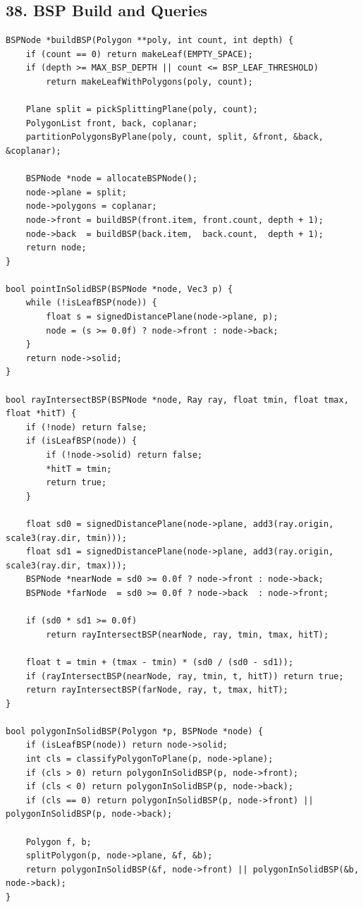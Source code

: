 \documentclass[10pt,letterpaper]{article}
\begin{document}
\subsection*{38. BSP Build and Queries}

\begin{verbatim}
BSPNode *buildBSP(Polygon **poly, int count, int depth) {
    if (count == 0) return makeLeaf(EMPTY_SPACE);
    if (depth >= MAX_BSP_DEPTH || count <= BSP_LEAF_THRESHOLD)
        return makeLeafWithPolygons(poly, count);

    Plane split = pickSplittingPlane(poly, count);
    PolygonList front, back, coplanar;
    partitionPolygonsByPlane(poly, count, split, &front, &back, &coplanar);

    BSPNode *node = allocateBSPNode();
    node->plane = split;
    node->polygons = coplanar;
    node->front = buildBSP(front.item, front.count, depth + 1);
    node->back  = buildBSP(back.item,  back.count,  depth + 1);
    return node;
}

bool pointInSolidBSP(BSPNode *node, Vec3 p) {
    while (!isLeafBSP(node)) {
        float s = signedDistancePlane(node->plane, p);
        node = (s >= 0.0f) ? node->front : node->back;
    }
    return node->solid;
}

bool rayIntersectBSP(BSPNode *node, Ray ray, float tmin, float tmax, float *hitT) {
    if (!node) return false;
    if (isLeafBSP(node)) {
        if (!node->solid) return false;
        *hitT = tmin;
        return true;
    }

    float sd0 = signedDistancePlane(node->plane, add3(ray.origin, scale3(ray.dir, tmin)));
    float sd1 = signedDistancePlane(node->plane, add3(ray.origin, scale3(ray.dir, tmax)));
    BSPNode *nearNode = sd0 >= 0.0f ? node->front : node->back;
    BSPNode *farNode  = sd0 >= 0.0f ? node->back  : node->front;

    if (sd0 * sd1 >= 0.0f)
        return rayIntersectBSP(nearNode, ray, tmin, tmax, hitT);

    float t = tmin + (tmax - tmin) * (sd0 / (sd0 - sd1));
    if (rayIntersectBSP(nearNode, ray, tmin, t, hitT)) return true;
    return rayIntersectBSP(farNode, ray, t, tmax, hitT);
}

bool polygonInSolidBSP(Polygon *p, BSPNode *node) {
    if (isLeafBSP(node)) return node->solid;
    int cls = classifyPolygonToPlane(p, node->plane);
    if (cls > 0) return polygonInSolidBSP(p, node->front);
    if (cls < 0) return polygonInSolidBSP(p, node->back);
    if (cls == 0) return polygonInSolidBSP(p, node->front) || polygonInSolidBSP(p, node->back);

    Polygon f, b;
    splitPolygon(p, node->plane, &f, &b);
    return polygonInSolidBSP(&f, node->front) || polygonInSolidBSP(&b, node->back);
}
\end{verbatim}
\end{document}
